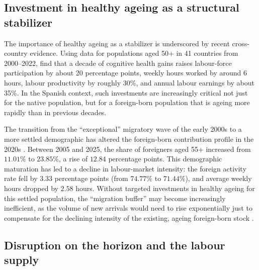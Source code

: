 \subsection{Investment in healthy ageing as a structural stabilizer}

The importance of healthy ageing as a stabilizer is underscored by recent cross-country evidence. Using data for populations aged 50+ in 41 countries from 2000--2022, \textcite{gruss2025healthyAging} find that a decade of cognitive health gains raises labour-force participation by about 20 percentage points, weekly hours worked by around 6 hours, labour productivity by roughly 30\%, and annual labour earnings by about 35\%. In the Spanish context, such investments are increasingly critical not just for the native population, but for a foreign-born population that is ageing more rapidly than in previous decades.

\vspace{0.7em}\par
The transition from the ``exceptional'' migratory wave of the early 2000s \parencite{arango2013exceptional} to a more settled demographic has altered the foreign-born contribution profile in the 2020s \parencite{bde2023ageingParticipation,caixabank2017labourForceAgeing}. Between 2005 and 2025, the share of foreigners aged 55+ increased from \(11.01\%\) to \(23.85\%\), a rise of \(12.84\) percentage points. This demographic maturation has led to a decline in labour-market intensity: the foreign activity rate fell by \(3.33\) percentage points (from \(74.77\%\) to \(71.44\%\)), and average weekly hours dropped by \(2.58\) hours. Without targeted investments in healthy ageing for this settled population, the ``migration buffer'' may become increasingly inefficient, as the volume of new arrivals would need to rise exponentially just to compensate for the declining intensity of the existing, ageing foreign-born stock \parencite{bde2023ageingParticipation, caixabank2017labourForceAgeing}.


\subsection{Disruption on the horizon and the labour supply}

